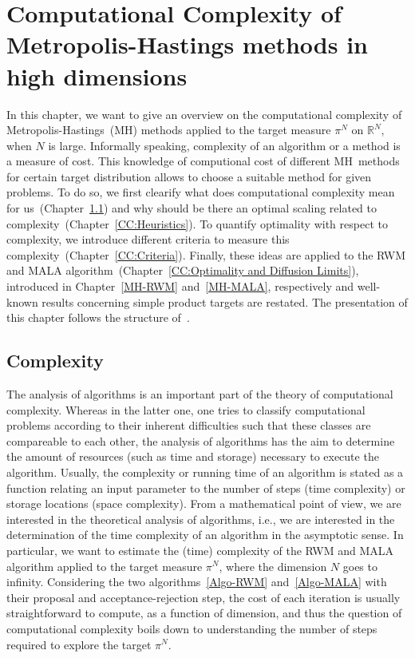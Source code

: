 \chapter[Computational Complexity]{Computational Complexity of Metropolis-Hastings methods in high dimensions}
\label{ch:Computational Complexity}

In this chapter, we want to give an overview on the computational complexity of Metropolis-Hastings~(MH) methods applied to the target measure $ \pi^{N} $ on $ \mathbb{R}^{N} $, when $N$ is large. Informally speaking, complexity of an algorithm or a method is a measure of cost. This knowledge of computional cost of different MH~methods for certain target distribution allows to choose a suitable method for given problems. To do so, we first clearify what does computational complexity mean for us~(Chapter~\ref{CC:Complexity}) and why should be there an optimal scaling related to complexity~(Chapter~\ref{CC:Heuristics}). To quantify optimality with respect to complexity, we introduce different criteria to measure this complexity~(Chapter~\ref{CC:Criteria}). Finally, these ideas are applied to the RWM and MALA algorithm~(Chapter~\ref{CC:Optimality and Diffusion Limits}), introduced in Chapter~\ref{MH-RWM} and~\ref{MH-MALA}, respectively and well-known results concerning simple product targets are restated. The presentation of this chapter follows the structure of~\autocite{Beskos2009, Roberts2001, Rosenthal2008}. 

\section{Complexity}
\label{CC:Complexity}

The analysis of algorithms is an important part of the theory of computational complexity. Whereas in the latter one, one tries to classify computational problems according to their inherent difficulties such that these classes are compareable to each other, the analysis of algorithms has the aim to determine the amount of resources (such as time and storage) necessary to execute the algorithm. Usually, the complexity or running time of an algorithm is stated as a function relating an input parameter to the number of steps (time complexity) or storage locations (space complexity). From a mathematical point of view, we are interested in the theoretical analysis of algorithms, i.e., we are interested in the determination of the time complexity of an algorithm in the asymptotic sense. In particular, we want to estimate the (time) complexity of the RWM and MALA algorithm applied to the target measure $ \pi^{N} $, where the dimension $N$ goes to infinity. Considering the two algorithms~\ref{Algo-RWM} and~\ref{Algo-MALA} with their proposal and acceptance-rejection step, the cost of each iteration is usually straightforward to compute, as a function of dimension, and thus the question of computational complexity boils down to understanding the number of steps required to explore the target $ \pi^{N} $.


